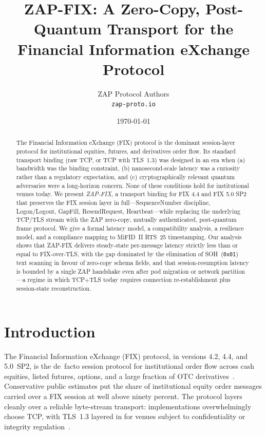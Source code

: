 \documentclass[11pt,a4paper]{article}
\title{ZAP-FIX: A Zero-Copy, Post-Quantum Transport for the Financial Information eXchange Protocol}
\author{ZAP Protocol Authors\\\texttt{zap-proto.io}}
\date{\today}
\begin{document}
\maketitle

\begin{abstract}
The Financial Information eXchange (FIX) protocol is the dominant
session-layer protocol for institutional equities, futures, and
derivatives order flow. Its standard transport binding (raw TCP, or
TCP with TLS~1.3) was designed in an era when (a) bandwidth was the
binding constraint, (b) nanosecond-scale latency was a curiosity rather
than a regulatory expectation, and (c) cryptographically relevant
quantum adversaries were a long-horizon concern. None of these
conditions hold for institutional venues today. We present
\emph{ZAP-FIX}, a transport binding for FIX 4.4 and FIX 5.0 SP2 that
preserves the FIX session layer in full---SequenceNumber discipline,
Logon/Logout, GapFill, ResendRequest, Heartbeat---while replacing the
underlying TCP/TLS stream with the ZAP zero-copy, mutually
authenticated, post-quantum frame protocol. We give a formal latency
model, a compatibility analysis, a resilience model, and a compliance
mapping to MiFID~II RTS~25 timestamping. Our analysis shows that
ZAP-FIX delivers steady-state per-message latency strictly less than
or equal to FIX-over-TLS, with the gap dominated by the elimination
of SOH~(\texttt{0x01}) text scanning in favour of zero-copy schema
fields, and that session-resumption latency is bounded by a single
ZAP handshake even after pod migration or network partition---a regime
in which TCP+TLS today requires connection re-establishment plus
session-state reconstruction.
\end{abstract}

\section{Introduction}
\label{sec:introduction}

The Financial Information eXchange (FIX) protocol, in versions 4.2,
4.4, and 5.0~SP2, is the de~facto session protocol for institutional
order flow across cash equities, listed futures, options, and a large
fraction of OTC derivatives~\cite{fix44,fix50sp2}. Conservative public
estimates put the share of institutional equity order messages carried
over a FIX session at well above ninety percent. The protocol layers
cleanly over a reliable byte-stream transport: implementations
overwhelmingly choose TCP, with TLS~1.3 layered in for venues subject
to confidentiality or integrity regulation~\cite{rfc8446,rfc9293}.
\end{document}
